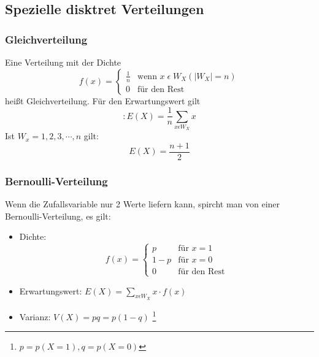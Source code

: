 \documentclass[a4paper]{scrartcl}
\begin{document}
        \subsection{Spezielle disktret Verteilungen}
            \subsubsection{Gleichverteilung}
                Eine Verteilung mit der Dichte 
                \[f(x)=
                    \begin{cases}
                        \frac{1}{n} & \text{wenn } x \; \epsilon \; W_X (|W_X| = n)\\
                        0 & \text{für den Rest} 
                    \end{cases}
                \] 
                heißt Gleichverteilung. Für den Erwartungswert gilt 
                \begin{equation*}:
                    E(X) = \frac{1}{n} \sum\limits_{x\epsilon W_X} x
                \end{equation*}
                Ist  \(W_x = 1,2,3, \cdots ,n\) gilt: 
                \begin{equation*}
                    E(X) = \frac{n+1}{2}
                \end{equation*} 
            \subsubsection{Bernoulli-Verteilung}
                Wenn die Zufallsvariable nur 2 Werte liefern kann, spircht man von einer Bernoulli-Verteilung, es gilt:
                \begin{itemize}
                    \item Dichte: \[f(x)=
                                                        \begin{cases}
                                                            p     & \text{für } x = 1 \\
                                                            1 - p & \text{für } x = 0 \\
                                                            0     & \text{für den Rest} 
                                                        \end{cases}
                                                        \] 
                    \item Erwartungswert: \(E(X) = \sum\limits_{x \epsilon W_X} x \cdot f(x) \)
                    \item Varianz: \(V(X) = pq = p (1 - q)\) \footnote{\(p = p(X=1), q = p(X=0)\)} %
                \end{itemize}
\end{document}

